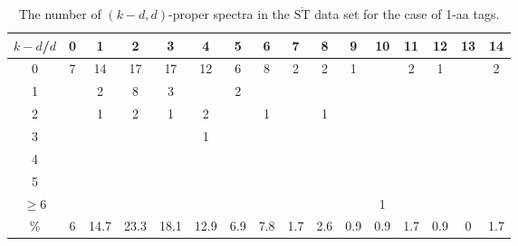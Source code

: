 \documentclass{article}[12pt]
\def\STbar{{\overline{\mathrm{ST}}}}
\begin{document}
\begin{landscape}

\begin{table}[h]\footnotesize
{\centering
\begin{tabular}{|c|c|
c|c|c|c|c|c|c|c|c|c|c|c|c|c|}
  \hline
  $k-d$/$d$ 
 & 0 & 1 & 2 & 3 & 4 & 5 & 6 & 7 & 8 & 9 & 10 & 11 & 12 & 13 & 14\\

  \hline
  \hline

0 & 7 & 14 & 17 & 17 & 12 & 6 & 8 & 2 & 2 & 1 &  & 2 & 1 &  & 2\\

1 &  & 2 & 8 & 3 &  & 2 &  &  &  &  &  &  &  &  & \\

2 &  & 1 & 2 & 1 & 2 &  & 1 &  & 1 &  &  &  &  &  & \\

3 &  &  &  &  & 1 &  &  &  &  &  &  &  &  &  & \\

4 &  &  &  &  &  &  &  &  &  &  &  &  &  &  & \\

5 &  &  &  &  &  &  &  &  &  &  &  &  &  &  & \\

$\ge6 $  &  &  &  &  &  &  &  &  &  &  & 1 &  &  &  & \\

  \hline

 \%  & 6 & 14.7 & 23.3 & 18.1 & 12.9 & 6.9 & 7.8 & 1.7 & 2.6 & 0.9 & 0.9 & 1.7 & 0.9 & 0 & 1.7\\

  \hline
\end{tabular}
\par}
\centering
\caption{The number of $(k-d,d)$-proper spectra in the $\STbar$ data set for the case of 1-aa tags.}
\vspace{3mm}
\label{table:kd-1-proper-ST-bar2}
\end{table}
\end{landscape}
\end{document}
